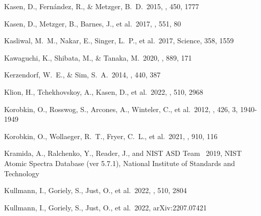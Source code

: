 \documentclass[twocolumn, twocolappendix]{aastex63}
\begin{document}
\begin{thebibliography}{}
 Kasen, D., Fern{\'a}ndez, R., \& Metzger, B.~D.\ 2015, \mnras, 450, 1777


 Kasen, D., Metzger, B., Barnes, J., et al.\ 2017, \nat, 551, 80




 Kasliwal, M.~M., Nakar, E., Singer, L.~P., et al.\ 2017, Science, 358, 1559








 Kawaguchi, K., Shibata, M., \& Tanaka, M.\ 2020, \apj, 889, 171


 Kerzendorf, W.~E., \& Sim, S.~A.\ 2014, \mnras, 440, 387




 Klion, H., Tchekhovskoy, A., Kasen, D., et al.\ 2022, \mnras, 510, 2968


 Korobkin, O., Rosswog, S., Arcones, A., Winteler, C., et al.\ 2012, \mnras, 426, 3, 1940-1949


 Korobkin, O., Wollaeger, R.~T., Fryer, C.~L., et al.\ 2021, \apj, 910, 116


 Kramida, A., Ralchenko, Y., Reader, J., and {NIST ASD Team} \ 2019, NIST Atomic Spectra Database (ver 5.7.1), National Institute of Standards and Technology


 Kullmann, I., Goriely, S., Just, O., et al.\ 2022, \mnras, 510, 2804


 Kullmann, I., Goriely, S., Just, O., et al.\ 2022, arXiv:2207.07421



\end{thebibliography}
\end{document}

